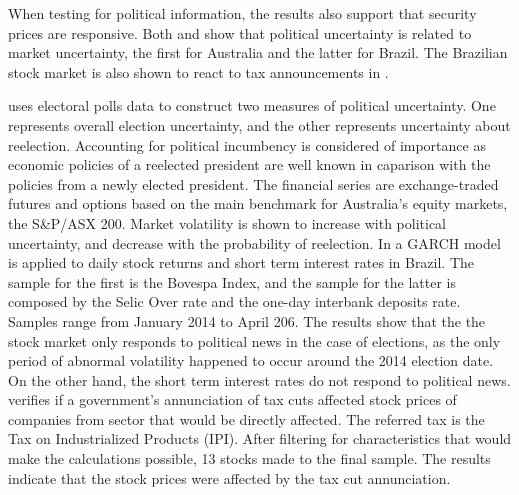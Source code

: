 \documentclass[a4paper]{article}
\begin{document}
When testing for political information, the results also support that security prices are responsive. Both \citet{smales2015} and \citet{marquessantos2016} show that political uncertainty is related to market uncertainty, the first for Australia and the latter for Brazil. The Brazilian stock market is also shown to react to tax announcements in \cite{gabrielribeiro2013}.

\citet{smales2015} uses electoral polls data to construct two measures of political uncertainty. One represents overall election uncertainty, and the other represents uncertainty about reelection. Accounting for political incumbency is considered of importance as economic policies of a reelected president are well known in caparison with the policies from a newly elected president. The financial series are exchange-traded futures and options based on the main benchmark for Australia's equity markets, the S\&P/ASX 200. Market volatility is shown to increase with political uncertainty, and decrease with the probability of reelection.
In \citet{marquessantos2016} a GARCH model is applied to daily stock returns and short term interest rates in Brazil. The sample for the first is the Bovespa Index, and the sample for the latter is composed by the Selic Over rate and the one-day interbank deposits rate. Samples range from January 2014 to April 206. The results show that the the stock market only responds to political news in the case of elections, as the only period of abnormal volatility happened to occur around the 2014 election date. On the other hand, the short term interest rates do not respond to political news.
\cite{gabrielribeiro2013} verifies if a government's annunciation of tax cuts affected stock prices of companies from sector that would be directly affected. The referred tax is the Tax on Industrialized Products (IPI). After filtering for characteristics that would make the calculations possible, 13 stocks made to the final sample. The results indicate that the stock prices were affected by the tax cut annunciation.
\end{document}
